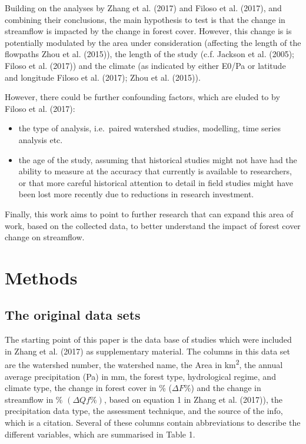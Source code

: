 \documentclass[]{elsarticle} %
\begin{document}
Building on the analyses by Zhang et al. (2017) and Filoso et al. (2017), and combining their conclusions, the main hypothesis to test is that the change in streamflow is impacted by the change in forest cover. However, this change is is potentially modulated by the area under consideration (affecting the length of the flowpaths Zhou et al. (2015)), the length of the study (c.f. Jackson et al. (2005); Filoso et al. (2017)) and the climate (as indicated by either E0/Pa or latitude and longitude Filoso et al. (2017); Zhou et al. (2015)).

However, there could be further confounding factors, which are eluded to by Filoso et al. (2017):

\begin{itemize}
\item
  the type of analysis, i.e.~paired watershed studies, modelling, time series analysis etc.
\item
  the age of the study, assuming that historical studies might not have had the ability to measure at the accuracy that currently is available to researchers, or that more careful historical attention to detail in field studies might have been lost more recently due to reductions in research investment.
\end{itemize}

Finally, this work aims to point to further research that can expand this area of work, based on the collected data, to better understand the impact of forest cover change on streamflow.

\hypertarget{methods}{%
\section{Methods}\label{methods}}

\hypertarget{the-original-data-sets}{%
\subsection{The original data sets}\label{the-original-data-sets}}

The starting point of this paper is the data base of studies which were included in Zhang et al. (2017) as supplementary material. The columns in this data set are the watershed number, the watershed name, the Area in km\textsuperscript{2}, the annual average precipitation (Pa) in mm, the forest type, hydrological regime, and climate type, the change in forest cover in \% (\(\Delta F\%\)) and the change in streamflow in \% \((\Delta Qf\%)\), based on equation 1 in Zhang et al. (2017)), the precipitation data type, the assessment technique, and the source of the info, which is a citation.
Several of these columns contain abbreviations to describe the different variables, which are summarised in Table 1.
\end{document}
